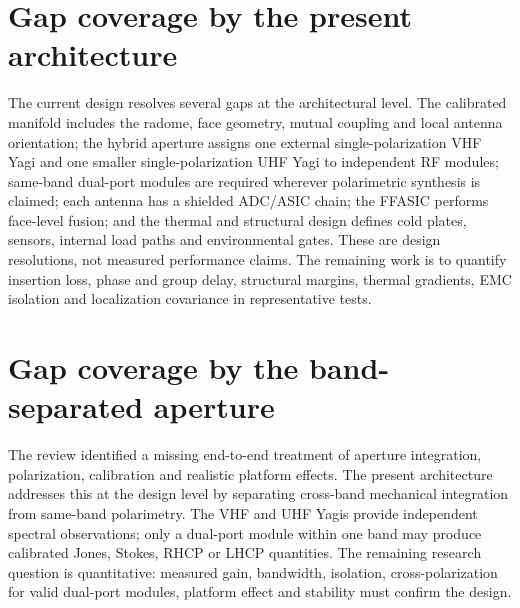 \section{Gap coverage by the present architecture}
The current design resolves several gaps at the architectural level. The calibrated manifold includes the radome, face geometry, mutual coupling and local antenna orientation; the hybrid aperture assigns one external single-polarization VHF Yagi and one smaller single-polarization UHF Yagi to independent RF modules; same-band dual-port modules are required wherever polarimetric synthesis is claimed; each antenna has a shielded ADC/ASIC chain; the FFASIC performs face-level fusion; and the thermal and structural design defines cold plates, sensors, internal load paths and environmental gates. These are design resolutions, not measured performance claims. The remaining work is to quantify insertion loss, phase and group delay, structural margins, thermal gradients, EMC isolation and localization covariance in representative tests.

\section{Gap coverage by the band-separated aperture}
The review identified a missing end-to-end treatment of aperture integration, polarization, calibration and realistic platform effects. The present architecture addresses this at the design level by separating cross-band mechanical integration from same-band polarimetry. The VHF and UHF Yagis provide independent spectral observations; only a dual-port module within one band may produce calibrated Jones, Stokes, RHCP or LHCP quantities. The remaining research question is quantitative: measured gain, bandwidth, isolation, cross-polarization for valid dual-port modules, platform effect and stability must confirm the design.
